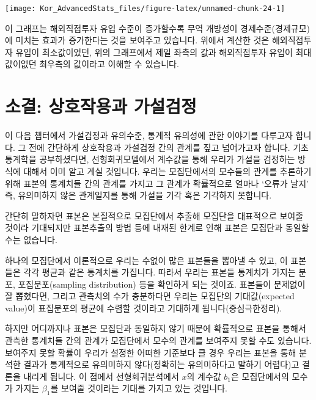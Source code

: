 \documentclass[
]{book}
\begin{document}
\begin{center}\texttt{[image: Kor\_AdvancedStats\_files/figure-latex/unnamed-chunk-24-1]} \end{center}

이 그래프는 해외직접투자 유입 수준이 증가할수록 무역 개방성이 경제수준(경제규모)에 미치는 효과가 증가한다는 것을 보여주고 있습니다. 위에서 계산한 것은 해외직접투자 유입이 최소값이었던, 위의 그래프에서 제일 좌측의 값과 해외직접투자 유입이 최대값이없던 최우측의 값이라고 이해할 수 있습니다.

\hypertarget{uxc18cuxacb0-uxc0c1uxd638uxc791uxc6a9uxacfc-uxac00uxc124uxac80uxc815}{%
\section{소결: 상호작용과 가설검정}\label{uxc18cuxacb0-uxc0c1uxd638uxc791uxc6a9uxacfc-uxac00uxc124uxac80uxc815}}

이 다음 챕터에서 가설검정과 유의수준, 통계적 유의성에 관한 이야기를 다루고자 합니다. 그 전에 간단하게 상호작용과 가설검정 간의 관계를 짚고 넘어가고자 합니다. 기초 통계학을 공부하셨다면, 선형회귀모델에서 계수값을 통해 우리가 가설을 검정하는 방식에 대해서 이미 알고 계실 것입니다. 우리는 모집단에서의 모수들의 관계를 추론하기 위해 표본의 통계치들 간의 관계를 가지고 그 관계가 확률적으로 얼마나 `오류가 날지' 즉, 유의미하지 않은 관계일지를 통해 가설을 기각 혹은 기각하지 못합니다.

간단히 말하자면 표본은 본질적으로 모집단에서 추출해 모집단을 대표적으로 보여줄 것이라 기대되지만 표본추출의 방법 등에 내재된 한계로 인해 표본은 모집단과 동일할 수는 없습니다.

하나의 모집단에서 이론적으로 우리는 수없이 많은 표본들을 뽑아낼 수 있고, 이 표본들은 각각 평균과 같은 통계치를 가집니다. 따라서 우리는 표본들 통계치가 가지는 분포, 포집분포(sampling distribution) 등을 확인하게 되는 것이죠. 표본들이 문제없이 잘 뽑혔다면, 그리고 관측치의 수가 충분하다면 우리는 모집단의 기대값(expected value)이 표집분포의 평균에 수렴할 것이라고 기대하게 됩니다(중심극한정리).

하지만 어디까지나 표본은 모집단과 동일하지 않기 때문에 확률적으로 표본을 통해서 관측한 통계치들 간의 관계가 모집단에서 모수의 관계를 보여주지 못할 수도 있습니다. 보여주지 못할 확률이 우리가 설정한 어떠한 기준보다 클 경우 우리는 표본을 통해 분석한 결과가 통계적으로 유의미하지 않다(정확히는 유의미하다고 말하기 어렵다)고 결론을 내리게 됩니다. 이 점에서 선형회귀분석에서 \(x\)의 계수값 \(b_1\)은 모집단에서의 모수가 가지는 \(\beta_1\)를 보여줄 것이라는 기대를 가지고 있는 것입니다.
\end{document}

